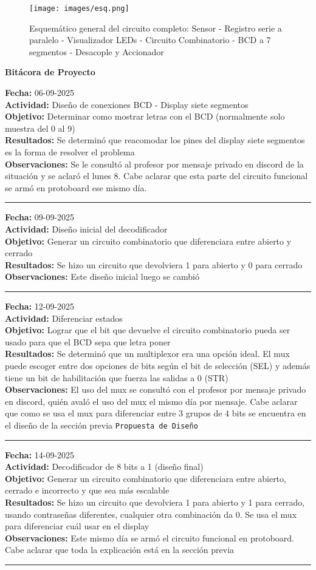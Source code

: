 \documentclass[12pt,a4paper]{article}
\newcommand{\entrada}[5]{
\noindent
\textbf{Fecha:} #1\\
\textbf{Actividad:} #2\\
\textbf{Objetivo:} #3\\
\textbf{Resultados:} #4\\
\textbf{Observaciones:} #5\\
\bigskip
\hrule
\bigskip
}
\begin{document}
\begin{figure}[h!] %
    \centering    
    \texttt{[image: images/esq.png]} %
    \caption{Esquemático general del circuito completo: Sensor - Registro serie a paralelo - Visualizador LEDs - Circuito Combinatorio - BCD a 7 segmentos - Desacople y Accionador}
    \label{fig:esq}
\end{figure}


\newpage

\begin{center}
    {\LARGE \textbf{Bitácora de Proyecto}}\\
    \vspace{0.2cm}
\end{center}

\bigskip

\entrada{06-09-2025}{Diseño de conexiones BCD - Display siete segmentos}{Determinar como mostrar letras con el BCD (normalmente solo muestra del 0 al 9)}{Se determinó que reacomodar los pines del display siete segmentos es la forma de resolver el problema}{Se le consultó al profesor por mensaje privado en discord de la situación y se aclaró el lunes 8. Cabe aclarar que esta parte del circuito funcional se armó en protoboard ese mismo día.}

\entrada{09-09-2025}{Diseño inicial del decodificador}{Generar un circuito combinatorio que diferenciara entre abierto y cerrado}{Se hizo un circuito que devolviera 1 para abierto y 0 para cerrado}{Este diseño inicial luego se cambió}

\entrada{12-09-2025}{Diferenciar estados}{Lograr que el bit que devuelve el circuito combinatorio pueda ser usado para que el BCD sepa que letra poner}{Se determinó que un multiplexor era una opción ideal. El mux puede escoger entre dos opciones de bits según el bit de selección (SEL) y además tiene un bit de habilitación que fuerza las salidas a 0 (STR)}{El uso del mux se consultó con el profesor por mensaje privado en discord, quién avaló el uso del mux el mismo día por mensaje. Cabe aclarar que como se usa el mux para diferenciar entre 3 grupos de 4 bits se encuentra en el diseño de la sección previa \texttt{Propuesta de Diseño}}

\entrada{14-09-2025}{Decodificador de 8 bits a 1 (diseño final)}{Generar un circuito combinatorio que diferenciara entre abierto, cerrado e incorrecto y que sea más escalable}{Se hizo un circuito que devolviera 1 para abierto y 1 para cerrado, usando contraseñas diferentes, cualquier otra combinación da 0. Se usa el mux para diferenciar cuál usar en el display}{Este mismo día se armó el circuito funcional en protoboard. Cabe aclarar que toda la explicación está en la sección previa}
\end{document}
